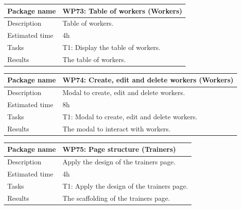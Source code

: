 \documentclass[a4paper, 12pt, oneside]{book}
\begin{document}
\vspace*{16pt}
\begin{tabularx}{\textwidth}{| l | X |}
	\hline
	\rowcolor{rowColor}
	{\semibf Package name}   & {\semibf WP73}: Table of workers (Workers)  \\
	\hline
	{\semibf Description}    & Table of workers.                           \\
	\hline
	\rowcolor{rowColor}
	{\semibf Estimated time} & 4h                                          \\
	\hline
	{\semibf Tasks}          & {\semibf T1}: Display the table of workers. \\
	\hline
	\rowcolor{rowColor}
	{\semibf Results}        & The table of workers.                       \\
	\hline
\end{tabularx}
\vspace*{16pt}
\begin{tabularx}{\textwidth}{| l | X |}
	\hline
	\rowcolor{rowColor}
	{\semibf Package name}   & {\semibf WP74}: Create, edit and delete workers (Workers) \\
	\hline
	{\semibf Description}    & Modal to create, edit and delete workers.                 \\
	\hline
	\rowcolor{rowColor}
	{\semibf Estimated time} & 8h                                                        \\
	\hline
	{\semibf Tasks}          & {\semibf T1}: Modal to create, edit and delete workers.   \\
	\hline
	\rowcolor{rowColor}
	{\semibf Results}        & The modal to interact with workers.                       \\
	\hline
\end{tabularx}
\vspace*{16pt}
\begin{tabularx}{\textwidth}{| l | X |}
	\hline
	\rowcolor{rowColor}
	{\semibf Package name}   & {\semibf WP75}: Page structure (Trainers)            \\
	\hline
	{\semibf Description}    & Apply the design of the trainers page.               \\
	\hline
	\rowcolor{rowColor}
	{\semibf Estimated time} & 4h                                                   \\
	\hline
	{\semibf Tasks}          & {\semibf T1}: Apply the design of the trainers page. \\
	\hline
	\rowcolor{rowColor}
	{\semibf Results}        & The scaffolding of the trainers page.                \\
	\hline
\end{tabularx}
\end{document}
